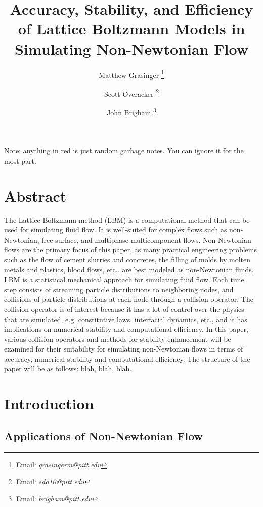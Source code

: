 \documentclass{article}
\title{Accuracy, Stability, and Efficiency of Lattice Boltzmann Models in Simulating Non-Newtonian Flow}
\author{{Matthew Grasinger}
\thanks{Email: \textit{grasingerm@pitt.edu}}}
\author{{Scott Overacker}
\thanks{Email: \textit{sdo10@pitt.edu}}}
\author{John Brigham
\thanks{Email: \textit{brigham@pitt.edu}}}
\affil{Civil and Environmental Engineering Department, University of Pittsburgh}
\begin{document}
\maketitle
\newpage
\tableofcontents
\newpage
{}

\linenumbers

Note: anything in {\color{red}red} is just random garbage notes.
You can ignore it for the most part.

\section*{Abstract}

The Lattice Boltzmann method (LBM) is a computational method that can be used for simulating fluid flow.
It is well-suited for complex flows such as non-Newtonian, free surface, and multiphase multicomponent flows.
Non-Newtonian flows are the primary focus of this paper, as many practical engineering problems such as the flow of cement slurries and concretes, the filling of molds by molten metals and plastics, blood flows, etc., are best modeled as non-Newtonian fluids.
LBM is a statistical mechanical approach for simulating fluid flow.
Each time step consists of streaming particle distributions to neighboring nodes, and collisions of particle distributions at each node through a collision operator.
The collision operator is of interest because it has a lot of control over the physics that are simulated, e.g. constitutive laws, interfacial dynamics, etc., and it has implications on numerical stability and computational efficiency.
In this paper, various collision operators and methods for stability enhancement will be examined for their suitability for simulating non-Newtonian flows in terms of accuracy, numerical stability and computational efficiency.
The structure of the paper will be as follows: blah, blah, blah.

\section{Introduction} %

\subsection{Applications of Non-Newtonian Flow}
\end{document}
